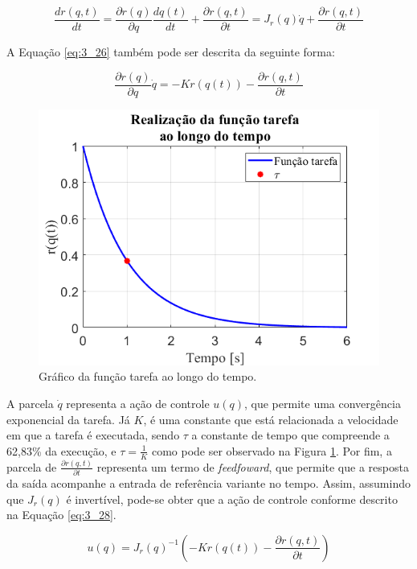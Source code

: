 \begin{equation}
\frac{dr(q,t)}{dt} = \frac{\partial r(q)}{\partial q} \frac{dq(t)}{dt} + \frac{\partial r(q,t)}{\partial t}= J_r(q) \dot{q} + \frac{\partial r(q,t)}{\partial t}
\label{eq:3_26}
\end{equation}

A Equação \ref{eq:3_26} também pode ser descrita da seguinte forma:

\begin{equation}
\frac{\partial r(q)}{\partial q} \dot{q} = -Kr(q(t)) - \frac{\partial r(q,t)}{\partial t}
\label{eq:3_27}
\end{equation}

\begin{figure}[b!]
\centering
\includegraphics[width=0.7\columnwidth]{Imagens/FuncaoTarefa.png}
\caption{Gráfico da função tarefa ao longo do tempo.}
\label{fig:FuncaoTarefa}
\end{figure}

A parcela $\dot{q}$ representa a ação de controle $u(q)$, que permite uma convergência exponencial da tarefa. Já $K$, é uma constante que está relacionada a velocidade em que a tarefa é executada, sendo $\tau$ a constante de tempo que compreende a 62,83\% da execução, e $\tau = \frac{1}{K}$ como pode ser observado na Figura \ref{fig:FuncaoTarefa}. Por fim, a parcela de $\frac{\partial r(q,t)}{\partial t}$ representa um termo de \textit{feedfoward}, que permite que a resposta da saída acompanhe a entrada de referência variante no tempo. Assim, assumindo que $J_r(q)$ é invertível, pode-se obter que a ação de controle conforme descrito na Equação \ref{eq:3_28}.

\begin{equation}
u(q) = J_r(q)^{-1} (-Kr(q(t)) - \frac{\partial r(q,t)}{\partial t})
\label{eq:3_28}
\end{equation}

